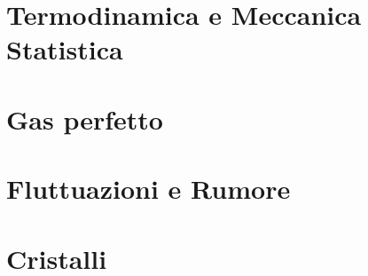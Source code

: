 \documentclass[a4paper,10pt]{book}
\begin{document}
\frontmatter


\clearpage


\mainmatter
\chapter{Termodinamica e Meccanica Statistica}



\chapter{Gas perfetto}

\chapter{Fluttuazioni e Rumore}

\chapter{Cristalli}

\appendix
\end{document}

